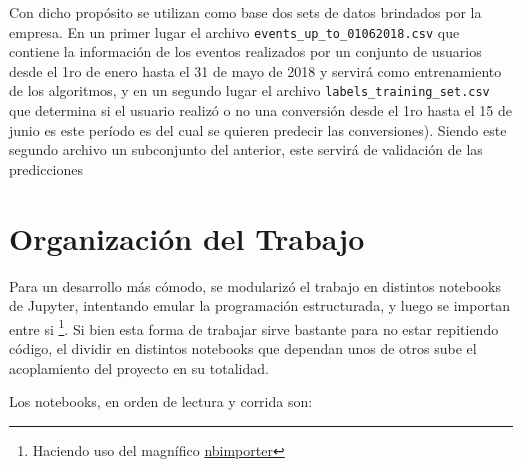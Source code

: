\documentclass[a4paper]{article}
\begin{document}
Con dicho propósito se utilizan como base dos sets de datos brindados por la empresa. En un primer lugar el archivo \texttt{events\_up\_to\_01062018.csv} que contiene la información de los eventos realizados por un conjunto de usuarios desde el 1ro de enero hasta el 31 de mayo de 2018 y servirá como entrenamiento de los algoritmos, y en un segundo lugar el archivo \texttt{labels\_training\_set.csv} que determina si el usuario realizó o no una conversión desde el 1ro hasta el 15 de junio es este período es del cual se quieren predecir las conversiones). Siendo este segundo archivo un subconjunto del anterior, este servirá de validación de las predicciones

\section{Organización del Trabajo}

Para un desarrollo más cómodo, se modularizó el trabajo en distintos notebooks de Jupyter, intentando emular la programación estructurada, y luego se importan entre si \footnote{Haciendo uso del magnífico \href{https://github.com/grst/nbimporter}{nbimporter}}. Si bien esta forma de trabajar sirve bastante para no estar repitiendo código, el dividir en distintos notebooks que dependan unos de otros sube el acoplamiento del proyecto en su totalidad.

Los notebooks, en orden de lectura y corrida son:
\end{document}
